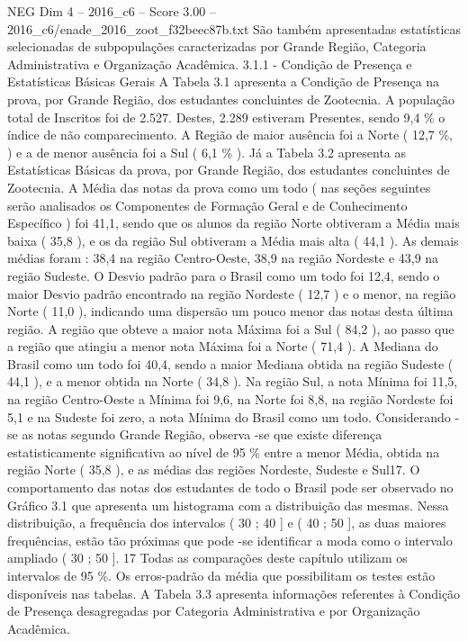 \begin{textsample}{NEG Dim 4 – 2016\_c6 – Score 3.00 – 2016\_c6/enade\_2016\_zoot\_f32beec87b.txt}
São também apresentadas estatísticas selecionadas de subpopulações caracterizadas por Grande Região, Categoria Administrativa e Organização Acadêmica. 3.1.1 - Condição de Presença e Estatísticas Básicas Gerais A Tabela 3.1 apresenta a Condição de Presença na prova, por Grande Região, dos estudantes concluintes de Zootecnia.
A população total de Inscritos foi de 2.527.
Destes, 2.289 estiveram Presentes, sendo 9,4 \% o índice de não comparecimento.
A Região de maior ausência foi a Norte ( 12,7 \%, ) e a de menor ausência foi a Sul ( 6,1 \% ).
Já a Tabela 3.2 apresenta as Estatísticas Básicas da prova, por Grande Região, dos estudantes concluintes de Zootecnia.
A Média das notas da prova como um todo ( nas seções seguintes serão analisados os Componentes de Formação Geral e de Conhecimento Específico ) foi 41,1, sendo que os alunos da região Norte obtiveram a Média mais baixa ( 35,8 ), e os da região Sul obtiveram a Média mais alta ( 44,1 ).
As demais médias foram : 38,4 na região Centro-Oeste, 38,9 na região Nordeste e 43,9 na região Sudeste.
O Desvio padrão para o Brasil como um todo foi 12,4, sendo o maior Desvio padrão encontrado na região Nordeste ( 12,7 ) e o menor, na região Norte ( 11,0 ), indicando uma dispersão um pouco menor das notas desta última região.
A região que obteve a maior nota Máxima foi a Sul ( 84,2 ), ao passo que a região que atingiu a menor nota Máxima foi a Norte ( 71,4 ).
A Mediana do Brasil como um todo foi 40,4, sendo a maior Mediana obtida na região Sudeste ( 44,1 ), e a menor obtida na Norte ( 34,8 ).
Na região Sul, a nota Mínima foi 11,5, na região Centro-Oeste a Mínima foi 9,6, na Norte foi 8,8, na região Nordeste foi 5,1 e na Sudeste foi zero, a nota Mínima do Brasil como um todo.
Considerando -se as notas segundo Grande Região, observa -se que existe diferença estatisticamente significativa ao nível de 95 \% entre a menor Média, obtida na região Norte ( 35,8 ), e as médias das regiões Nordeste, Sudeste e Sul17.
O comportamento das notas dos estudantes de todo o Brasil pode ser observado no Gráfico 3.1 que apresenta um histograma com a distribuição das mesmas.
Nessa distribuição, a frequência dos intervalos ( 30 ; 40 ] e ( 40 ; 50 ], as duas maiores frequências, estão tão próximas que pode -se identificar a moda como o intervalo ampliado ( 30 ; 50 ]. 17 Todas as comparações deste capítulo utilizam os intervalos de 95 \%.
Os erros-padrão da média que possibilitam os testes estão disponíveis nas tabelas.
A Tabela 3.3 apresenta informações referentes à Condição de Presença desagregadas por Categoria Administrativa e por Organização Acadêmica.

\end{textsample}
